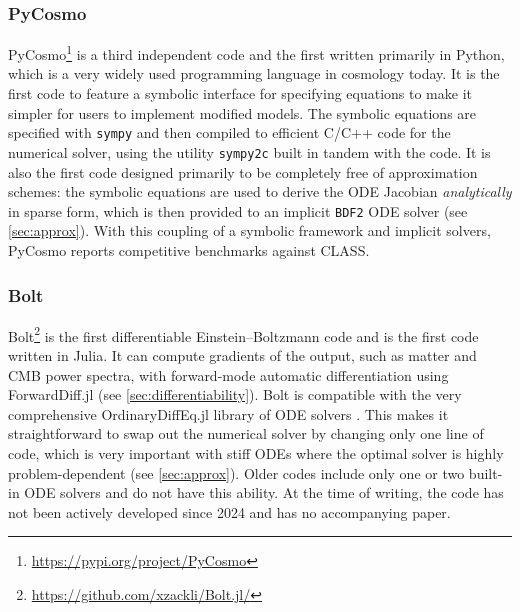 \documentclass[USenglish, thumbmarks]{uiophdthesis} %
\newcommand\EB{Einstein--Boltzmann}
\begin{document}
\subsubsection{PyCosmo}
PyCosmo\footnote{\url{https://pypi.org/project/PyCosmo}} \cite{refregierPyCosmoIntegratedCosmological2018,tarsitanoPredictingCosmologicalObservables2021,moserSymbolicImplementationExtensions2022}
is a third independent code and the first written primarily in Python,
which is a very widely used programming language in cosmology today.
It is the first code to feature a symbolic interface for specifying equations
to make it simpler for users to implement modified models.
The symbolic equations are specified with \texttt{sympy} and then compiled to efficient C/C++ code for the numerical solver,
using the utility \texttt{sympy2c} \cite{schmittSympy2cSymbolicExpressions2023} built in tandem with the code.
It is also the first code designed primarily to be completely free of approximation schemes:
the symbolic equations are used to derive the ODE Jacobian \emph{analytically} in sparse form,
which is then provided to an implicit \texttt{BDF2} ODE solver (see \cref{sec:approx}).
With this coupling of a symbolic framework and implicit solvers,
PyCosmo reports competitive benchmarks against CLASS.

\subsubsection{Bolt}
Bolt\footnote{\url{https://github.com/xzackli/Bolt.jl/}} \cite{XzackliBoltjlCitation}
is the first differentiable \EB{} code and is the first code written in Julia.
It can compute gradients of the output, such as matter and CMB power spectra,
with forward-mode automatic differentiation using ForwardDiff.jl \cite{revelsForwardModeAutomaticDifferentiation2016} (see \cref{sec:differentiability}).
Bolt is compatible with the very comprehensive OrdinaryDiffEq.jl library of ODE solvers \cite{rackauckasDifferentialEquationsjlPerformantFeatureRich2017a}.
This makes it straightforward to swap out the numerical solver by changing only one line of code,
which is very important with stiff ODEs where the optimal solver is highly problem-dependent (see \cref{sec:approx}).
Older codes include only one or two built-in ODE solvers and do not have this ability.
At the time of writing, the code has not been actively developed since 2024 and has no accompanying paper.
\end{document}
